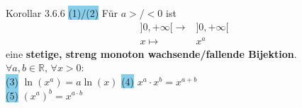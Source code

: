 \documentclass[landscape, 10pt]{article}
\newcommand{\R}{\mathbb{R}}
\begin{document}
\begin{multicols}{3}
              \colorbox{BurntOrange}{Korollar 3.6.6} 
                     \colorbox{SkyBlue}{(1)/(2)}
                            Für \textcolor{NavyBlue}{$a>$/$<0$} 
                            ist 
                            \begin{align*}
                                   ]0,+\infty[\longrightarrow
                                   &]0,+\infty[\\
                                   x\longmapsto &x^a
                            \end{align*}
                            eine \textbf{stetige, streng monoton 
                            wachsende/fallende Bijektion}. \\
                            \textcolor{NavyBlue}{
                            $\forall a,b\in\R,\,\forall x>0$}:\\
                     \colorbox{SkyBlue}{(3)} 
                            \textcolor{NavyBlue}{
                            $\ln(x^a)=a\ln(x)$} \qquad
                     \colorbox{SkyBlue}{(4)} 
                            \textcolor{NavyBlue}{
                            $x^a\cdot x^b=x^{a+b}$}\\
                     \colorbox{SkyBlue}{(5)} 
                            \textcolor{NavyBlue}{
                            $(x^a)^b=x^{a\cdot b}$}

\end{multicols}
\end{document}
